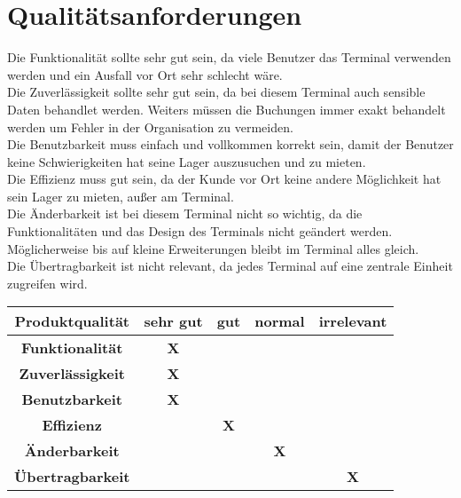 
\section{Qualitätsanforderungen}
Die Funktionalität sollte sehr gut sein, da viele Benutzer das Terminal verwenden werden und ein Ausfall vor Ort sehr schlecht wäre. \\
Die Zuverlässigkeit sollte sehr gut sein, da bei diesem Terminal auch sensible Daten behandlet werden. Weiters müssen die Buchungen immer exakt behandelt werden um Fehler in der Organisation zu vermeiden.\\
Die Benutzbarkeit muss einfach und vollkommen korrekt sein, damit der Benutzer keine Schwierigkeiten hat seine Lager auszusuchen und zu mieten.\\
Die Effizienz muss gut sein, da der Kunde vor Ort keine andere Möglichkeit hat sein Lager zu mieten, außer am Terminal.\\
Die Änderbarkeit ist bei diesem Terminal nicht so wichtig, da die Funktionalitäten und das Design des Terminals nicht geändert werden. Möglicherweise bis auf kleine Erweiterungen bleibt im Terminal alles gleich.\\
Die Übertragbarkeit ist nicht relevant, da jedes Terminal auf eine zentrale Einheit zugreifen wird.\\


\begin{center}
\begin{tabular}{ |c|c|c|c|c| } 
 \hline
 \textbf{Produktqualität} & \textbf{sehr gut} & \textbf{gut} & \textbf{normal} & \textbf{irrelevant} \\ 
 \hline
 \textbf{Funktionalität} & \textbf{X} &  &  &  \\ 
 \hline
 \textbf{Zuverlässigkeit} & \textbf{X} &   &   &  \\
 \hline
 \textbf{Benutzbarkeit} & \textbf{X} &   &   &  \\
 \hline
 \textbf{Effizienz} &   & \textbf{X}  &   &  \\
 \hline
 \textbf{Änderbarkeit} &   &   & \textbf{X}  &  \\
 \hline
 \textbf{Übertragbarkeit} &   &   &   & \textbf{X}  \\ 
 \hline
\end{tabular}
\end{center}
